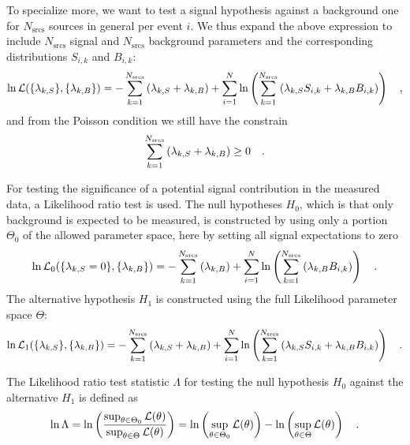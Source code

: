 To specialize more, we want to test a signal hypothesis against a background one for $N_\text{srcs}$ sources in general per event $i$.
We thus expand the above expression to include $N_\text{srcs}$ signal and $N_\text{srcs}$ background parameters and the corresponding distributions $S_{i,k}$ and $B_{i,k}$:
\begin{equation}
  \ln\mathcal{L}(\{\lambda_{k,S}\}, \{\lambda_{k,B}\})
  = -\sum_{k=1}^{N_\text{srcs}}\left(\lambda_{k,S}+\lambda_{k,B}\right) +
    \sum_{i=1}^N \ln\left(\sum_{k=1}^{N_\text{srcs}}\left(
      \lambda_{k,S} S_{i,k}+\lambda_{k,B} B_{i,k}\right)\right)
  \quad\text{,}
\end{equation}
and from the Poisson condition we still have the constrain
\begin{equation}
  \sum_{k=1}^{N_\text{srcs}}\left(\lambda_{k,S}+\lambda_{k,B}\right) \geq 0
  \quad\text{.}
\end{equation}

For testing the significance of a potential signal contribution in the measured data, a Likelihood ratio test is used.
The null hypotheses $H_0$, which is that only background is expected to be measured, is constructed by using only a portion $\Theta_0$ of the allowed parameter space, here by setting all signal expectations to zero
\begin{equation}
  \ln\mathcal{L}_0(\{\lambda_{k,S}=0\}, \{\lambda_{k,B}\})
  = -\sum_{k=1}^{N_\text{srcs}}\left(\lambda_{k,B}\right) +
    \sum_{i=1}^N \ln\left(\sum_{k=1}^{N_\text{srcs}}\left(
      \lambda_{k,B} B_{i,k}\right)\right)
  \quad\text{.}
\end{equation}
The alternative hypothesis $H_1$ is constructed using the full Likelihood parameter space $\Theta$:
\begin{equation}
  \ln\mathcal{L}_1(\{\lambda_{k,S}\}, \{\lambda_{k,B}\})
  = -\sum_{k=1}^{N_\text{srcs}}\left(\lambda_{k,S}+
                                     \lambda_{k,B}\right) +
    \sum_{i=1}^N \ln\left(\sum_{k=1}^{N_\text{srcs}}\left(
      \lambda_{k,S} S_{i,k}+\lambda_{k,B} B_{i,k}\right)\right)
  \quad\text{.}
\end{equation}

The Likelihood ratio test statistic $\Lambda$ for testing the null hypothesis $H_0$ against the alternative $H_1$ is defined as
\begin{equation}
  \ln\Lambda = \ln\left(\frac{\sup_{\theta \in \Theta_0} \mathcal{L}(\theta)}
                          {\sup_{\theta \in \Theta} \mathcal{L}(\theta)}\right)
  = \ln\left(\sup_{\theta \in \Theta_0} \mathcal{L}(\theta)\right) -
    \ln\left(\sup_{\theta \in \Theta} \mathcal{L}(\theta)\right)
  \quad\text{.}
\end{equation}

